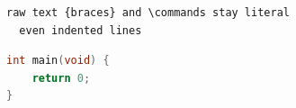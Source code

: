 \begin{verbatim}
raw text {braces} and \commands stay literal
  even indented lines
\end{verbatim}

\begin{lstlisting}[language=C]
int main(void) {
    return 0;
}
\end{lstlisting}

